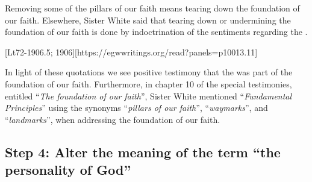 Removing some of the pillars of our faith means tearing down the foundation of our faith. Elsewhere, Sister White said that tearing down or undermining the foundation of our faith is done by indoctrination of the sentiments regarding the .

[Lt72-1906.5; 1906][https://egwwritings.org/read?panels=p10013.11]

In light of these quotations we see positive testimony that the  was part of the foundation of our faith. Furthermore, in chapter 10 of the special testimonies, entitled “\textit{The foundation of our faith}”, Sister White mentioned “\textit{Fundamental Principles}” using the synonyms “\textit{pillars of our faith}”, “\textit{waymarks}”, and “\textit{landmarks}”, when addressing the foundation of our faith.

\subsection*{Step 4: Alter the meaning of the term “the personality of God”}

